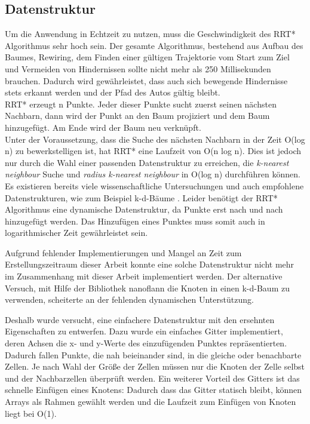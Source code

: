 \subsection{Datenstruktur}
Um die Anwendung in Echtzeit zu nutzen, muss die Geschwindigkeit des RRT* Algorithmus sehr hoch sein. Der gesamte Algorithmus, bestehend aus Aufbau des Baumes, Rewiring, dem Finden einer gültigen Trajektorie vom Start zum Ziel und Vermeiden von Hindernissen sollte nicht mehr als 250 Millisekunden brauchen. Dadurch wird gewährleistet, dass auch sich bewegende Hindernisse stets erkannt werden und der Pfad des Autos gültig bleibt. \\
RRT* erzeugt n Punkte. Jeder dieser Punkte sucht zuerst seinen nächsten Nachbarn, dann wird der Punkt an den Baum projiziert und dem Baum hinzugefügt. Am Ende wird der Baum neu verknüpft. \\
Unter der Voraussetzung, dass die Suche des nächsten Nachbarn in der Zeit O(log n) zu bewerkstelligen ist, hat RRT* eine Laufzeit von O(n log n). Dies ist jedoch nur durch die Wahl einer passenden Datenstruktur zu erreichen, die \textit{k-nearest neighbour} Suche und \textit{radius k-nearest neighbour} in O(log n) durchführen können.\\
Es existieren bereits viele wissenschaftliche Untersuchungen und auch empfohlene Datenstrukturen, wie zum Beispiel k-d-Bäume \citep{Bentley75}. Leider benötigt der RRT* Algorithmus eine dynamische Datenstruktur, da Punkte erst nach und nach hinzugefügt werden. Das Hinzufügen eines Punktes muss somit auch in logarithmischer Zeit gewährleistet sein. 

Aufgrund fehlender Implementierungen und Mangel an Zeit zum Erstellungszeitraum dieser Arbeit konnte eine solche Datenstruktur nicht mehr im Zusammenhang mit dieser Arbeit implementiert werden. Der alternative Versuch, mit Hilfe der Bibliothek nanoflann \citep{blanco2014nanoflann} die Knoten in einen k-d-Baum zu verwenden, scheiterte an der fehlenden dynamischen Unterstützung.

Deshalb wurde versucht, eine einfachere Datenstruktur mit den ersehnten Eigenschaften zu entwerfen. Dazu wurde ein einfaches Gitter implementiert, deren Achsen die x- und y-Werte des einzufügenden Punktes repräsentierten. Dadurch fallen Punkte, die nah beieinander sind, in die gleiche oder benachbarte Zellen. Je nach Wahl der Größe der Zellen müssen nur die Knoten der Zelle selbst und der Nachbarzellen überprüft werden. Ein weiterer Vorteil des Gitters ist das schnelle Einfügen eines Knotens: Dadurch dass das Gitter statisch bleibt, können Arrays als Rahmen gewählt werden und die Laufzeit zum Einfügen von Knoten liegt bei O(1).

